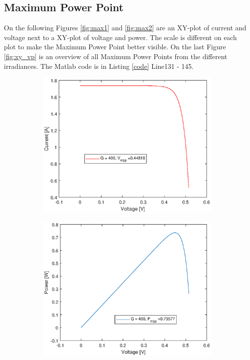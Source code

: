 	\subsection{Maximum Power Point}
	On the following Figures \ref{fig:max1} and \ref{fig:max2} are an XY-plot of current and voltage next to a XY-plot of voltage and power. The scale is different on each plot to make the Maximum Power Point better visible. On the last Figure \ref{fig:xy_vp} is an overview of all Maximum Power Points from the different irradiances. The Matlab code is in Listing \ref{code} Line131 - 145.
	

	
		\begin{figure}[H]
		\begin{center}
			\begin{subfigure}{0.4\textwidth}
			\begin{center}
				\includegraphics[width=1\textwidth]{figures/vg400.eps}
			\end{center}	
			\end{subfigure}
			\begin{subfigure}{0.4\textwidth}
				\begin{center}
					\includegraphics[width=1\textwidth]{figures/pg400.eps}

\end{center}
\end{subfigure}
\end{center}
\end{figure}
